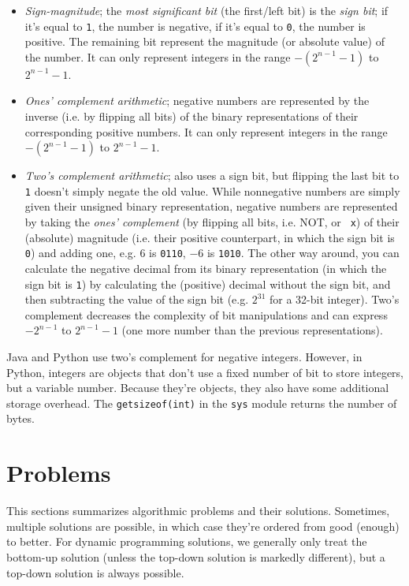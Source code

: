 \documentclass[table, xcdraw]{article}%
\begin{document}
\begin{itemize}
    \item \textit{Sign-magnitude}; the \textit{most significant bit} (the first/left bit) is the \textit{sign bit}; if it's equal to \texttt{1}, the number is negative, if it's equal to \texttt{0}, the number is positive. The remaining bit represent the magnitude (or absolute value) of the number. It can only represent integers in the range $-(2^{n-1}-1)$ to $2^{n-1}-1$.
    \item \textit{Ones' complement arithmetic}; negative numbers are represented by the inverse (i.e. by flipping all bits) of the binary representations of their corresponding positive numbers. It can only represent integers in the range $-(2^{n-1}-1)$ to $2^{n-1}-1$.
    \item \textit{Two's complement arithmetic}; also uses a sign bit, but flipping the last bit to \texttt{1} doesn't simply negate the old value. While nonnegative numbers are simply given their unsigned binary representation, negative numbers are represented by taking the \textit{ones' complement} (by flipping all bits, i.e. NOT, or \texttt{~x}) of their (absolute) magnitude (i.e. their positive counterpart, in which the sign bit is \texttt{0}) and adding one, e.g. $6$ is \texttt{0110}, $-6$ is \texttt{1010}. The other way around, you can calculate the negative decimal from its binary representation (in which the sign bit is \texttt{1}) by calculating the (positive) decimal without the sign bit, and then subtracting the value of the sign bit (e.g. $2^31$ for a 32-bit integer). Two's complement decreases the complexity of bit manipulations and can express $-2^{n-1}$ to $2^{n-1}-1$ (one more number than the previous representations).
\end{itemize}

Java and Python use two's complement for negative integers. However, in Python, integers are objects that don’t use a fixed number of bit to store integers, but a variable number. Because they're objects, they also have some additional storage overhead. The \texttt{getsizeof(int)} in the \texttt{sys} module returns the number of bytes.

\section{Problems}

This sections summarizes algorithmic problems and their solutions. Sometimes, multiple solutions are possible, in which case they're ordered from good (enough) to better. For dynamic programming solutions, we generally only treat the bottom-up solution (unless the top-down solution is markedly different), but a top-down solution is always possible.
\end{document}
